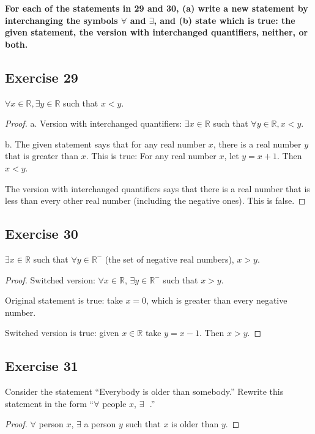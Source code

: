 \documentclass[14pt]{extarticle}
\newcommand{\fbl}{\underline{\hspace{1cm}}\,\,}
\newcommand{\R}{\mathbb{R}}
\newcommand{\fa}{\forall}
\newcommand{\te}{\exists}
\begin{document}
{\bf \color{cyan} For each of the statements in 29 and 30, (a) write a new statement by interchanging the symbols $\fa$ and $\te$, and (b) state which is true: the given statement, the version with interchanged quantifiers, neither, or both.}

\subsection{Exercise 29}
$\fa x \in \R, \te y \in \R$ such that $x < y$.

\begin{proof}
    a. Version with interchanged quantifiers: $\te x \in \R$ such that $\fa y \in \R, x < y.$

    b. The given statement says that for any real number $x$,
    there is a real number $y$ that is greater than $x$. This
    is true: For any real number $x$, let $y = x + 1$. Then
    $x < y$.

    The version with interchanged quantifiers says that there is a real number that is less than every other real number (including the negative ones). This is false.
\end{proof}

\subsection{Exercise 30}
$\te x \in \R$ such that $\fa y \in \R^-$ (the set of negative real numbers), $x > y$.

\begin{proof}
    Switched version: $\fa x \in \R$, $\te y \in \R^-$ such that $x > y$.

    Original statement is true: take $x = 0$, which is greater than every negative number.

    Switched version is true: given $x \in \R$ take $y = x - 1$. Then $x > y$.
\end{proof}

\subsection{Exercise 31}
Consider the statement “Everybody is older than somebody.” Rewrite this statement in the form “$\fa$ people $x$, $\te$ \fbl.”

\begin{proof}
    $\fa$ person $x$, $\te$ a person $y$ such that $x$ is older than $y$.
\end{proof}
\end{document}

